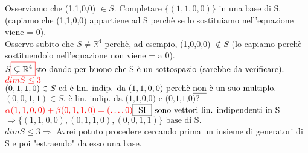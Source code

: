 \textsf{\small Osserviamo che (1,1,0,0) $ \in S$. Completare $\{ (1,1,0,0)\}$ in una base di S. (capiamo che (1,1,0,0) appartiene ad S perchè se lo sostituiamo nell'equazione viene = 0).}\\
\textsf{\small Osservo subito che $S \neq \mathbb{R}^4$ perchè, ad esempio, (1,0,0,0) $ \notin S $ (lo capiamo perchè sostituendolo nell'equazione non viene = a 0).}\\
\(
S \color{red}\boxed{\normalcolor \subsetneq \mathbb{R}^4} \normalcolor \text{sto dando per buono che S è un sottospazio (sarebbe da verificare).} 
\)\\
\(
\color{red} dim S \leq 3 \normalcolor
\)\\
\(
(0,1,1,0) \in S \text{ ed è lin. indip. da } (1,1,0,0) \text{ perchè \underline{\underline{non}} è un suo multiplo.}
\)\\
\(
(0,0,1,1) \in S. \text{ è lin. indip. da (1,1,0,0) e (0,1,1,0)?}
\)\\
\(
\color{red} \alpha(1,1,0,0) + \beta(0,1,1,0) = (\dots, 0) \normalcolor \boxed{\text{ SI }}  \text{ sono vettori lin. indipendenti in S}
\)
\(
\Rightarrow \{ (1,1,0,0), (0,1,1,0), (0,0,1,1)\} \text{ base di S.}
\)\\
\(
dim S \leq 3 \Rightarrow
\)
\textsf{\small Avrei potuto procedere cercando prima un insieme di generatori di S e poi "estraendo" da esso una base.}\\

